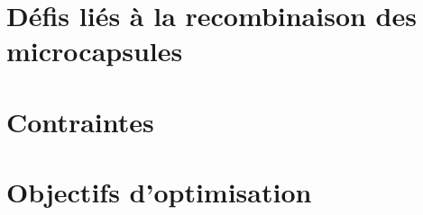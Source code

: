 \section{Défis liés à la recombinaison des microcapsules}
\section{Contraintes}
\section{Objectifs d'optimisation}